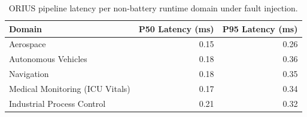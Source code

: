 \begin{table}[htbp]
\centering
\caption{ORIUS pipeline latency per non-battery runtime domain under fault injection.}
\label{tab:all_domain_latency}
\begin{tabular}{lrr}
\toprule
Domain & P50 Latency (ms) & P95 Latency (ms) \\
\midrule
Aerospace & 0.15 & 0.26 \\
Autonomous Vehicles & 0.18 & 0.36 \\
Navigation & 0.18 & 0.35 \\
Medical Monitoring (ICU Vitals) & 0.17 & 0.34 \\
Industrial Process Control & 0.21 & 0.32 \\
\bottomrule
\end{tabular}
\end{table}
